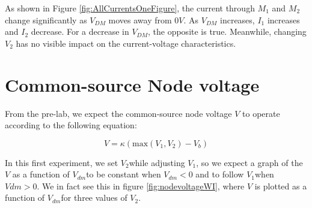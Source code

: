 \documentclass{article}
\newcommand{\Vtwo}{{$V_{2}$}}
\newcommand{\Vone}{{$V_{1}$}}
\newcommand{\Vdm}{{$V_{dm}$}}
\begin{document}
As shown in Figure \ref{fig:AllCurrentsOneFigure}, the current through $M_1$ and $M_2$ change significantly as $V_{DM}$ moves away from $0V$. As $V_{DM}$ increases, $I_1$ increases and $I_2$ decrease. For a decrease in $V_{DM}$, the opposite is true. Meanwhile, changing $V_2$ has no visible impact on the current-voltage characteristics.







\section*{Common-source Node voltage}

From the pre-lab, we expect the common-source node voltage $V$ to operate according to the following equation:

\begin{equation}
V = \kappa (\textrm{max}(V_1,V_2) - V_b)
\label{eq:nodevoltageeq}
\end{equation}

In this first experiment, we set \Vtwo while adjusting \Vone, so we expect a graph of the $V$ as a function of \Vdm to be constant when $V_{dm} < 0$ and to follow \Vone when $V{dm} > 0$. We in fact see this in figure \ref{fig:nodevoltageWI}, where $V$ is plotted as a function of \Vdm for three values of \Vtwo.
\end{document}
